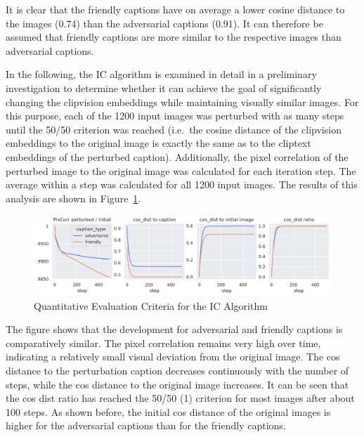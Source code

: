 It is clear that the friendly captions have on average a lower cosine distance to the images (0.74) than the adversarial captions (0.91). It can therefore be assumed that friendly captions are more similar to the respective images than adversarial captions. 

In the following, the IC algorithm is examined in detail in a preliminary investigation to determine whether it can achieve the goal of significantly changing the clipvision embeddings while maintaining visually similar images. For this purpose, each of the 1200 input images was perturbed with as many steps until the 50/50 criterion was reached (i.e.\ the cosine distance of the clipvision embeddings to the original image is exactly the same as to the cliptext embeddings of the perturbed caption). Additionally, the pixel correlation of the perturbed image to the original image was calculated for each iteration step. The average within a step was calculated for all 1200 input images. The results of this analysis are shown in Figure~\ref{fig:advpert_validation_ic_loss_curves}. 


\begin{figure}[ht]
    \centering
    \includegraphics[width=1\textwidth]{plots/advpert_validation_ic_loss_curves.png}
    \caption{Quantitative Evaluation Criteria for the IC Algorithm}\label{fig:advpert_validation_ic_loss_curves}
\end{figure}

The figure shows that the development for adversarial and friendly captions is comparatively similar. The pixel correlation remains very high over time, indicating a relatively small visual deviation from the original image. The cos distance to the perturbation caption decreases continuously with the number of steps, while the cos distance to the original image increases. It can be seen that the cos dist ratio has reached the 50/50 (1) criterion for most images after about 100 steps. As shown before, the initial cos distance of the original images is higher for the adversarial captions than for the friendly captions.

